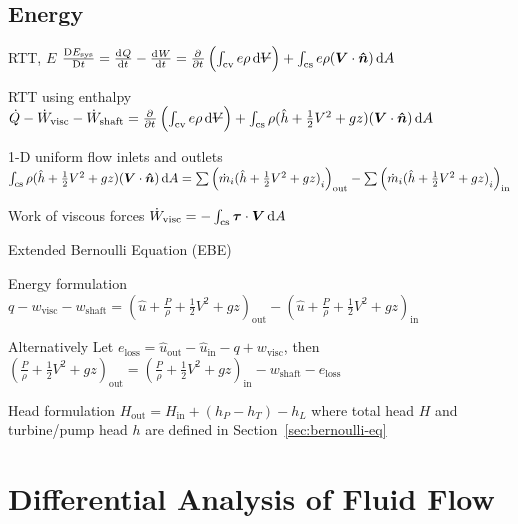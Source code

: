 \documentclass{article}
\begin{document}
\subsection{Energy}
\begin{description*}
\item[RTT, $E$]
  \(\frac{\Dif E_\mathrm{sys}}{\Dif t}
  = \od{Q}{t}-\od{W}{t}
  = \pd{}{t}\left(\int_\mathrm{cv}e\rho\dif{\volsym}\right)
  + \int_\mathrm{cs}e\rho(\vec{V}\cdot\uvec{n})\dif{A}\)
\item[RTT using enthalpy]
  \(\dot{Q}-\dot{W}_\mathrm{visc}-\dot{W}_\mathrm{shaft}
  = \pd{}{t}\left(\int_\mathrm{cv}e\rho\dif{\volsym}\right)
  + \int_\mathrm{cs}\rho(\hat{h}+\frac{1}{2}V^2+gz)(\vec{V}\cdot\uvec{n})\dif{A}\)
\item[1-D uniform flow inlets and outlets]~\\
  \(\int_\mathrm{cs}\rho(\hat{h}+\frac{1}{2}V^2+gz)(\vec{V}\cdot\uvec{n})\dif{A}
  = \sum{\left(\dot{m}_i{(\hat{h}+\frac{1}{2}V^2+gz)}_i\right)}_\mathrm{out}
  - \sum{\left(\dot{m}_i{(\hat{h}+\frac{1}{2}V^2+gz)}_i\right)}_\mathrm{in}\)
\item[Work of viscous forces]
  \(\dot{W}_\mathrm{visc} = -\int_\mathrm{cs}\vec\tau\cdot\vec{V}\dif{A}\)
\item[Extended Bernoulli Equation (EBE)]~
  \begin{description*}
  \item[Energy formulation]
    \(q - w_\mathrm{visc} - w_\mathrm{shaft}
    = {\left(\hat{u}+\frac{P}{\rho}+\frac{1}{2}V^2+gz\right)}_\mathrm{out}
    - {\left(\hat{u}+\frac{P}{\rho}+\frac{1}{2}V^2+gz\right)}_\mathrm{in}\)
  \item[Alternatively]
    Let \(e_\mathrm{loss} = \hat{u}_\mathrm{out}-\hat{u}_\mathrm{in}-q+w_\mathrm{visc}\), then \\
    \({\left(\frac{P}{\rho}+\frac{1}{2}V^2+gz\right)}_\mathrm{out}
    = {\left(\frac{P}{\rho}+\frac{1}{2}V^2+gz\right)}_\mathrm{in}
    - w_\mathrm{shaft} - e_\mathrm{loss}\)
  \item[Head formulation]
    \(H_\mathrm{out} = H_\mathrm{in} + (h_P-h_T) - h_L\)
    where total head $H$ and turbine\slash{}pump head $h$ are defined in
    Section~\ref{sec:bernoulli-eq}
  \end{description*}
\end{description*}

\section{Differential Analysis of Fluid Flow}
\end{document}
